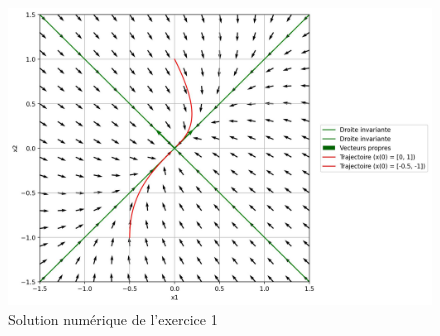             \begin{figure}[ht!]
                \centering
                \includegraphics[width=\textwidth]{images/pdp_exercice_1.jpg}
                \caption{Solution numérique de l'exercice 1}
                \label{fig:pdp_exercice_1}
            \end{figure}
                
